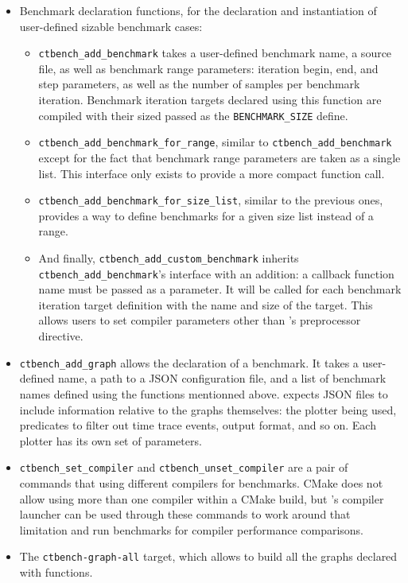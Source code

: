 \documentclass[../main]{subfiles}
\begin{document}
\begin{itemize}

\item Benchmark declaration functions, for the declaration and instantiation
of user-defined sizable benchmark cases:

  \begin{itemize}

  \item
  \lstinline{ctbench_add_benchmark} takes a user-defined benchmark name,
  a \cpp source file, as well as benchmark range parameters: iteration begin,
  end, and step parameters, as well as the number of samples per benchmark
  iteration. Benchmark iteration targets declared using this function are
  compiled with their sized passed as the \lstinline{BENCHMARK_SIZE} define.

  \item
  \lstinline{ctbench_add_benchmark_for_range}, similar to
  \lstinline{ctbench_add_benchmark} except for the fact that benchmark range
  parameters are taken as a single list. This interface only exists to provide
  a more compact function call.

  \item
  \lstinline{ctbench_add_benchmark_for_size_list}, similar to the previous ones,
  provides a way to define benchmarks for a given size list instead of a range.

  \item
  And finally, \lstinline{ctbench_add_custom_benchmark} inherits
  \lstinline{ctbench_add_benchmark}'s interface with an addition:
  a callback function name must be passed as a parameter. It will be called
  for each benchmark iteration target definition with the name and size of the
  target. This allows users to set compiler parameters other than \ctbench's
  preprocessor directive.

  \end{itemize}

\item
\lstinline{ctbench_add_graph} allows the declaration of a benchmark.
It takes a user-defined name, a path to a JSON configuration file,
and a list of benchmark names defined using the functions mentionned above.
\ctbench expects JSON files to include information relative to the graphs
themselves: the plotter being used, predicates to filter out time trace events,
output format, and so on. Each plotter has its own set of parameters.

\item
\lstinline{ctbench_set_compiler} and \lstinline{ctbench_unset_compiler}
are a pair of commands that using different compilers for benchmarks.
CMake does not allow using more than one compiler within a CMake build,
but \ctbench's compiler launcher can be used through these commands
to work around that limitation and run benchmarks for compiler performance
comparisons.

\item
The \lstinline{ctbench-graph-all} target, which allows to build all the graphs
declared with \ctbench functions.

\end{itemize}
\end{document}
